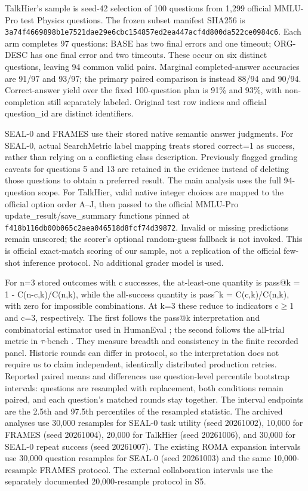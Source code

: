\documentclass[10pt,letterpaper,twocolumn]{article}
\begin{document}
TalkHier's sample is seed-42 selection of 100 questions from 1,299 official MMLU-Pro test Physics questions. The frozen subset manifest SHA256 is \nolinkurl{3a74f4669898b1e7521dae29e6cbc154857ed2ea447acf4d800da522ce0984c6}. Each arm completes 97 questions: BASE has two final errors and one timeout; ORG-DESC has one final error and two timeouts. These occur on six distinct questions, leaving 94 common valid pairs. Marginal completed-answer accuracies are 91/97 and 93/97; the primary paired comparison is instead 88/94 and 90/94. Correct-answer yield over the fixed 100-question plan is 91\% and 93\%, with non-completion still separately labeled. Original test row indices and official question\_id are distinct identifiers.


SEAL-0 and FRAMES use their stored native semantic answer judgments. For SEAL-0, actual SearchMetric label mapping treats stored correct=1 as success, rather than relying on a conflicting class description. Previously flagged grading caveats for questions 5 and 13 are retained in the evidence instead of deleting those questions to obtain a preferred result. The main analysis uses the full 94-question scope. For TalkHier, valid native integer choices are mapped to the official option order A--J, then passed to the official MMLU-Pro update\_result/save\_summary functions pinned at \nolinkurl{f418b116db00b065c2aea046518d8fcf74d39872}. Invalid or missing predictions remain unscored; the scorer's optional random-guess fallback is not invoked. This is official exact-match scoring of our sample, not a replication of the official few-shot inference protocol. No additional grader model is used.


For n=3 stored outcomes with c successes, the at-least-one quantity is pass@k = 1 - C(n-c,k)/C(n,k), while the all-success quantity is pass\textasciicircum{}k = C(c,k)/C(n,k), with zero for impossible combinations. At k=3 these reduce to indicators c$\geq$1 and c=3, respectively. The first follows the pass@k interpretation and combinatorial estimator used in HumanEval \cite{humaneval}; the second follows the all-trial metric in $\tau$-bench \cite{taubench}. They measure breadth and consistency in the finite recorded panel. Historic rounds can differ in protocol, so the interpretation does not require us to claim independent, identically distributed production retries. Reported paired means and differences use question-level percentile bootstrap intervals: questions are resampled with replacement, both conditions remain paired, and each question's matched rounds stay together. The interval endpoints are the 2.5th and 97.5th percentiles of the resampled statistic. The archived analyses use 30,000 resamples for SEAL-0 task utility (seed 20261002), 10,000 for FRAMES (seed 20261004), 20,000 for TalkHier (seed 20261006), and 30,000 for SEAL-0 repeat success (seed 20261007). The existing ROMA expansion intervals use 30,000 question resamples for SEAL-0 (seed 20261003) and the same 10,000-resample FRAMES protocol. The external collaboration intervals use the separately documented 20,000-resample protocol in S5.
\end{document}
